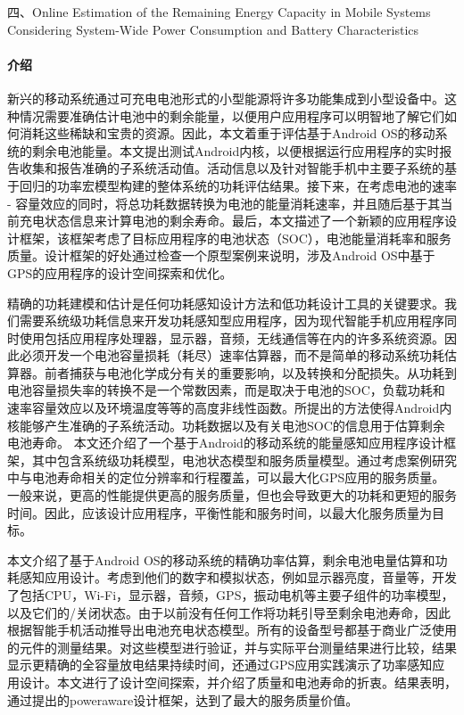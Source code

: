 \documentclass[a4paper]{article}
\begin{document}
四、Online Estimation of the Remaining Energy Capacity in Mobile Systems Considering System-Wide Power Consumption and Battery Characteristics
		

\paragraph{介绍}
新兴的移动系统通过可充电电池形式的小型能源将许多功能集成到小型设备中。这种情况需要准确估计电池中的剩余能量，以便用户应用程序可以明智地了解它们如何消耗这些稀缺和宝贵的资源。因此，本文着重于评估基于Android OS的移动系统的剩余电池能量。本文提出测试Android内核，以便根据运行应用程序的实时报告收集和报告准确的子系统活动值。活动信息以及针对智能手机中主要子系统的基于回归的功率宏模型构建的整体系统的功耗评估结果。接下来，在考虑电池的速率 - 容量效应的同时，将总功耗数据转换为电池的能量消耗速率，并且随后基于其当前充电状态信息来计算电池的剩余寿命。最后，本文描述了一个新颖的应用程序设计框架，该框架考虑了目标应用程序的电池状态（SOC），电池能量消耗率和服务质量。设计框架的好处通过检查一个原型案例来说明，涉及Android OS中基于GPS的应用程序的设计空间探索和优化。

精确的功耗建模和估计是任何功耗感知设计方法和低功耗设计工具的关键要求。我们需要系统级功耗信息来开发功耗感知型应用程序，因为现代智能手机应用程序同时使用包括应用程序处理器，显示器，音频，无线通信等在内的许多系统资源。因此必须开发一个电池容量损耗（耗尽）速率估算器，而不是简单的移动系统功耗估算器。前者捕获与电池化学成分有关的重要影响，以及转换和分配损失。从功耗到电池容量损失率的转换不是一个常数因素，而是取决于电池的SOC，负载功耗和速率容量效应以及环境温度等等的高度非线性函数。所提出的方法使得Android内核能够产生准确的子系统活动。功耗数据以及有关电池SOC的信息用于估算剩余电池寿命。
本文还介绍了一个基于Android的移动系统的能量感知应用程序设计框架，其中包含系统级功耗模型，电池状态模型和服务质量模型。通过考虑案例研究中与电池寿命相关的定位分辨率和行程覆盖，可以最大化GPS应用的服务质量。一般来说，更高的性能提供更高的服务质量，但也会导致更大的功耗和更短的服务时间。因此，应该设计应用程序，平衡性能和服务时间，以最大化服务质量为目标。

本文介绍了基于Android OS的移动系统的精确功率估算，剩余电池电量估算和功耗感知应用设计。考虑到他们的数字和模拟状态，例如显示器亮度，音量等，开发了包括CPU，Wi-Fi，显示器，音频，GPS，振动电机等主要子组件的功率模型，以及它们的/关闭状态。由于以前没有任何工作将功耗引导至剩余电池寿命，因此根据智能手机活动推导出电池充电状态模型。所有的设备型号都基于商业广泛使用的元件的测量结果。对这些模型进行验证，并与实际平台测量结果进行比较，结果显示更精确的全容量放电结果持续时间，还通过GPS应用实践演示了功率感知应用设计。本文进行了设计空间探索，并介绍了质量和电池寿命的折衷。结果表明，通过提出的poweraware设计框架，达到了最大的服务质量价值。
\end{document}
